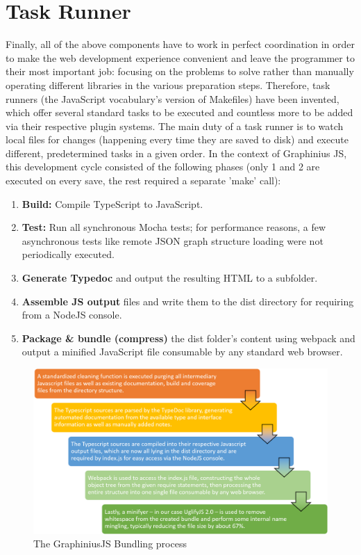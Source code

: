 \section{Task Runner}
\label{sect:build_system}

	Finally, all of the above components have to work in perfect coordination in order to make the web development experience convenient and leave the programmer to their most important job: focusing on the problems to solve rather than manually operating different libraries in the various preparation steps. Therefore, task runners (the JavaScript vocabulary's version of Makefiles) have been invented, which offer several standard tasks to be executed and countless more to be added via their respective plugin systems. The main duty of a task runner is to watch local files for changes (happening every time they are saved to disk) and execute different, predetermined tasks in a given order. In the context of Graphinius JS, this development cycle consisted of the following phases (only 1 and 2 are executed on every save, the rest required a separate 'make' call):
	
	\begin{enumerate}
		\item \textbf{Build:} Compile TypeScript to JavaScript.
		\item \textbf{Test:} Run all synchronous Mocha tests; for performance reasons, a few asynchronous tests like remote JSON graph structure loading were not periodically executed.
		\item \textbf{Generate Typedoc} and output the resulting HTML to a subfolder.
		\item \textbf{Assemble JS output} files and write them to the dist directory for requiring from a NodeJS console.
		\item \textbf{Package \& bundle (compress)} the dist folder's content using webpack and output a minified JavaScript file consumable by any standard web browser.
	\end{enumerate}
	
	\begin{figure}[ht]
		\label{fig_js_bundling}
		\hspace*{-0.5cm}
		\includegraphics[width=1.1\textwidth]{figures/bundle_process}
		\caption{The GraphiniusJS Bundling process}
	\end{figure}
	
